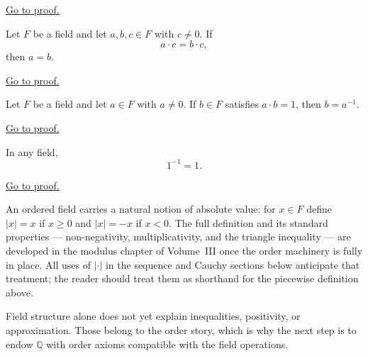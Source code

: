 \begin{remark*}[Proof]
\hyperref[prf:additive-cancellation]{Go to proof.}
\end{remark*}

\begin{theorem}
\label{thm:multiplicative-cancellation}
Let $F$ be a field and let $a,b,c\in F$ with $c\neq 0$.  If
\[
a\cdot c = b\cdot c,
\]
then $a = b$.
\end{theorem}

\begin{remark*}[Proof]
\hyperref[prf:multiplicative-cancellation]{Go to proof.}
\end{remark*}

\begin{theorem}
\label{thm:uniqueness-of-multiplicative-inverse}
Let $F$ be a field and let $a\in F$ with $a\neq 0$.  If $b\in F$
satisfies $a\cdot b = 1$, then $b = a^{-1}$.
\end{theorem}

\begin{remark*}[Proof]
\hyperref[prf:uniqueness-of-multiplicative-inverse]{Go to proof.}
\end{remark*}

\begin{theorem}
\label{thm:one-inverse-is-one}
In any field,
\[
1^{-1}=1.
\]
\end{theorem}

\begin{remark*}[Proof]
\hyperref[prf:one-inverse-is-one]{Go to proof.}
\end{remark*}

\begin{remark}
\label{rem:absolute-value-forward-ref}
An ordered field carries a natural notion of absolute value: for
$x\in F$ define $|x|=x$ if $x\geq 0$ and $|x|=-x$ if $x<0$.
The full definition and its standard properties --- non-negativity,
multiplicativity, and the triangle inequality --- are developed in
the modulus chapter of Volume~III once the order machinery is fully
in place.
All uses of $|{\cdot}|$ in the sequence and Cauchy sections below
anticipate that treatment; the reader should treat them as shorthand
for the piecewise definition above.
\end{remark}

\begin{remark}
Field structure alone does not yet explain inequalities, positivity, or
approximation. Those belong to the order story, which is why the next
step is to endow $\mathbb{Q}$ with order axioms compatible with the
field operations.
\end{remark}
